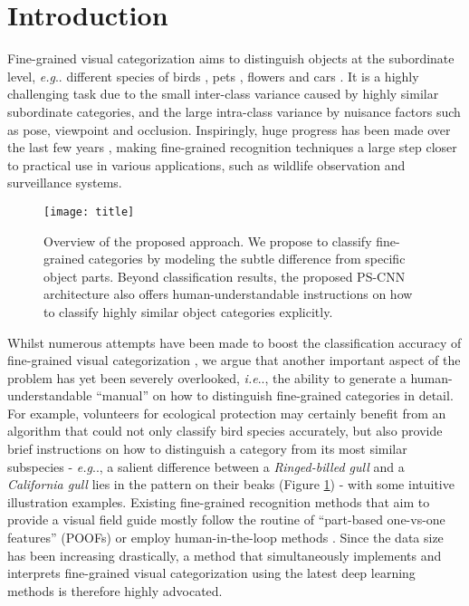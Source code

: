 \documentclass[10pt,twocolumn,letterpaper]{article}
\makeatletter
\DeclareRobustCommand\onedot{\futurelet\@let@token\@onedot}
\def\@onedot{\ifx\@let@token.\else.\null\fi\xspace}
\def\eg{\emph{e.g}\onedot} \def\Eg{\emph{E.g}\onedot}
\def\ie{\emph{i.e}\onedot} \def\Ie{\emph{I.e}\onedot}
\makeatother
\begin{document}
\section{Introduction}
\label{sec:intro}
Fine-grained visual categorization aims to distinguish objects at the subordinate level, \eg different species of birds \cite{welinder2010caltech,wah2011caltech,berg2014birdsnap}, pets \cite{khosla2011novel,parkhi2012cats}, flowers \cite{nilsback2008automated,angelova2013image} and cars \cite{stark2011fine,maji2013fine}. It is a highly challenging task due to the small inter-class variance caused by highly similar subordinate categories, and the large intra-class variance by nuisance factors such as pose, viewpoint and occlusion. Inspiringly, huge progress has been made over the last few years \cite{wah2011multiclass,berg2014birdsnap,vedaldi2014understanding,krause2015fine,xu2015augmenting}, making fine-grained recognition techniques a large step closer to practical use in various applications, such as wildlife observation and surveillance systems.



\begin{figure}[t]
\begin{center}
\texttt{[image: title]}
\end{center}
   \caption{Overview of the proposed approach. We propose to classify fine-grained categories by modeling the subtle difference from specific object parts. Beyond classification results, the proposed PS-CNN architecture also offers human-understandable instructions on how to classify highly similar object categories explicitly.}
\label{fig:title}
\end{figure}





Whilst numerous attempts have been made to boost the classification accuracy of fine-grained visual categorization \cite{deng2013fine,chai2013symbiotic,branson2014bird,lin2015bilinear}, we argue that another important aspect of the problem has yet been severely overlooked, \ie, the ability to generate a human-understandable ``manual'' on how to distinguish fine-grained categories in detail. For example, volunteers for ecological protection may certainly benefit from an algorithm that could not only classify bird species accurately, but also provide brief instructions on how to distinguish a category from its most similar subspecies - \eg, a salient difference between a \textit{Ringed-billed gull} and a \textit{California gull} lies in the pattern on their beaks (Figure \ref{fig:title}) - with some intuitive illustration examples. Existing fine-grained recognition methods that aim to provide a visual field guide mostly follow the routine of ``part-based one-vs-one features'' (POOFs) \cite{berg2013poof,berg2013you,berg2014birdsnap} or employ human-in-the-loop methods \cite{kumar2012leafsnap,branson2014ignorant,van2015building}.
Since the data size has been increasing drastically, a method that simultaneously implements and interprets fine-grained visual categorization using the latest deep learning methods \cite{krizhevsky2012imagenet} is therefore highly advocated.
\end{document}
